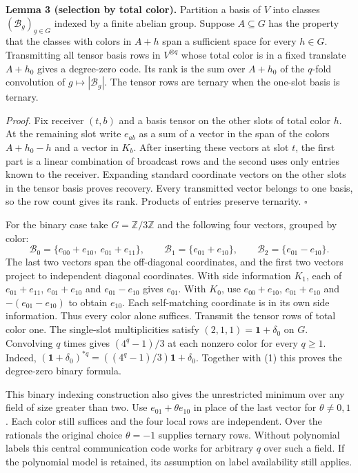 \documentclass[
  10pt,
]{article}
\begin{document}
\textbf{Lemma 3 (selection by total color).} Partition a basis of \(V\)
into classes \((\mathcal B_g)_{g\in G}\) indexed by a finite abelian
group. Suppose \(A\subseteq G\) has the property that the classes with
colors in \(A+h\) span a sufficient space for every \(h\in G\).
Transmitting all tensor basis rows in \(V^{\otimes q}\) whose total
color is in a fixed translate \(A+h_0\) gives a degree-zero code. Its
rank is the sum over \(A+h_0\) of the \(q\)-fold convolution of
\(g\mapsto |\mathcal B_g|\). The tensor rows are ternary when the
one-slot basis is ternary.

\emph{Proof.} Fix receiver \((t,b)\) and a basis tensor on the other
slots of total color \(h\). At the remaining slot write \(e_{ab}\) as a
sum of a vector in the span of the colors \(A+h_0-h\) and a vector in
\(K_b\). After inserting these vectors at slot \(t\), the first part is
a linear combination of broadcast rows and the second uses only entries
known to the receiver. Expanding standard coordinate vectors on the
other slots in the tensor basis proves recovery. Every transmitted
vector belongs to one basis, so the row count gives its rank. Products
of entries preserve ternarity. \(\square\)

For the binary case take \(G=\mathbb Z/3\mathbb Z\) and the following
four vectors, grouped by color: \[
 \mathcal B_0=\{e_{00}+e_{10},\ e_{01}+e_{11}\},\qquad
 \mathcal B_1=\{e_{01}+e_{10}\},\qquad
 \mathcal B_2=\{e_{01}-e_{10}\}.
\] The last two vectors span the off-diagonal coordinates, and the first
two vectors project to independent diagonal coordinates. With side
information \(K_1\), each of \(e_{01}+e_{11}\), \(e_{01}+e_{10}\) and
\(e_{01}-e_{10}\) gives \(e_{01}\). With \(K_0\), use \(e_{00}+e_{10}\),
\(e_{01}+e_{10}\) and \(-(e_{01}-e_{10})\) to obtain \(e_{10}\). Each
self-matching coordinate is in its own side information. Thus every
color alone suffices. Transmit the tensor rows of total color one. The
single-slot multiplicities satisfy \((2,1,1)=\mathbf1+\delta_0\) on
\(G\). Convolving \(q\) times gives \((4^q-1)/3\) at each nonzero color
for every \(q\ge1\). Indeed,
\((\mathbf1+\delta_0)^{*q}=((4^q-1)/3)\mathbf1+\delta_0\). Together with
(1) this proves the degree-zero binary formula.

This binary indexing construction also gives the unrestricted minimum
over any field of size greater than two. Use \(e_{01}+\theta e_{10}\) in
place of the last vector for \(\theta\ne0,1\). Each color still suffices
and the four local rows are independent. Over the rationals the original
choice \(\theta=-1\) supplies ternary rows. Without polynomial labels
this central communication code works for arbitrary \(q\) over such a
field. If the polynomial model is retained, its assumption on label
availability still applies.
\end{document}
